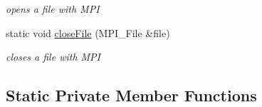 \begin{DoxyCompactItemize}
\begin{DoxyCompactList}\small\item\em opens a file with M\+PI \end{DoxyCompactList}\item 
static void \hyperlink{classParallel_ad9ace91bf01fd00c19f7a20efc796285}{close\+File} (M\+P\+I\+\_\+\+File \&file)\hypertarget{classParallel_ad9ace91bf01fd00c19f7a20efc796285}{}\label{classParallel_ad9ace91bf01fd00c19f7a20efc796285}

\begin{DoxyCompactList}\small\item\em closes a file with M\+PI \end{DoxyCompactList}\end{DoxyCompactItemize}
\subsection*{Static Private Member Functions}

